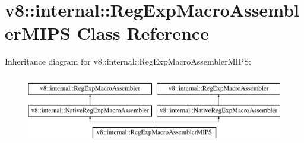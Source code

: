 \hypertarget{classv8_1_1internal_1_1RegExpMacroAssemblerMIPS}{}\section{v8\+:\+:internal\+:\+:Reg\+Exp\+Macro\+Assembler\+M\+I\+PS Class Reference}
\label{classv8_1_1internal_1_1RegExpMacroAssemblerMIPS}
Inheritance diagram for v8\+:\+:internal\+:\+:Reg\+Exp\+Macro\+Assembler\+M\+I\+PS\+:\begin{figure}[H]
\begin{center}
\leavevmode
\includegraphics[height=3.000000cm]{classv8_1_1internal_1_1RegExpMacroAssemblerMIPS}
\end{center}
\end{figure}
